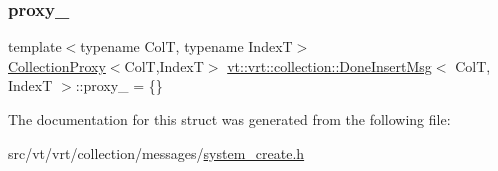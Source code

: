 \mbox{\label{structvt_1_1vrt_1_1collection_1_1_done_insert_msg_a3e434d7629ebc4bed5372d30165ef08d}} 
\subsubsection{\texorpdfstring{proxy\+\_\+}{proxy\_}}
{\footnotesize\ttfamily template$<$typename ColT, typename IndexT$>$ \\
\hyperlink{structvt_1_1vrt_1_1collection_1_1_collection_proxy}{Collection\+Proxy}$<$ColT,IndexT$>$ \hyperlink{structvt_1_1vrt_1_1collection_1_1_done_insert_msg}{vt\+::vrt\+::collection\+::\+Done\+Insert\+Msg}$<$ ColT, IndexT $>$\+::proxy\+\_\+ = \{\}}



The documentation for this struct was generated from the following file\+:\begin{DoxyCompactItemize}
\item 
src/vt/vrt/collection/messages/\hyperlink{system__create_8h}{system\+\_\+create.\+h}\end{DoxyCompactItemize}
